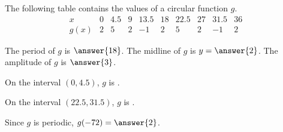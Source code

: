 \documentclass{ximera}
\author{Kenneth Berglund}
\begin{document}
\begin{exercise}
The following table contains the values of a circular function $g$. 
$$
\begin{array}{c|ccccccccc}
x&0&4.5&9&13.5&18&22.5&27&31.5&36\\
\hline
g(x)&2&5&2&-1&2&5&2&-1&2
\end{array}
$$

The period of $g$ is $\answer{18}$. The midline of $g$ is $y = \answer{2}$. The amplitude of $g$ is $\answer{3}$.

On the interval $(0, 4.5)$, $g$ is .

On the interval $(22.5, 31.5)$, $g$ is .

Since $g$ is periodic, $g(-72) = \answer{2}$. 


\end{exercise}
\end{document}
